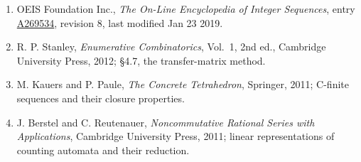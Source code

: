 \documentclass[11pt]{article}
\theoremstyle{definition}
\begin{document}
\begin{enumerate}

\item OEIS Foundation Inc., \emph{The On-Line Encyclopedia of Integer Sequences}, entry \href{https://oeis.org/A269534}{A269534}, revision 8, last modified Jan 23 2019.

\item R. P. Stanley, \emph{Enumerative Combinatorics}, Vol.~1, 2nd ed., Cambridge University Press, 2012; \S4.7, the transfer-matrix method.

\item M. Kauers and P. Paule, \emph{The Concrete Tetrahedron}, Springer, 2011; C-finite sequences and their closure properties.

\item J. Berstel and C. Reutenauer, \emph{Noncommutative Rational Series with Applications}, Cambridge University Press, 2011; linear representations of counting automata and their reduction.

\end{enumerate}
\end{document}

